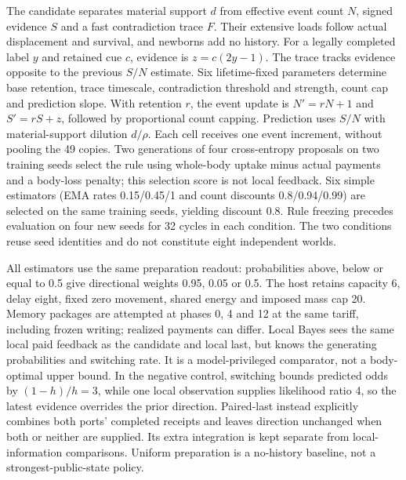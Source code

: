 The candidate separates material support $d$ from effective event count $N$, signed evidence $S$ and a fast contradiction trace $F$. Their extensive loads follow actual displacement and survival, and newborns add no history. For a legally completed label $y$ and retained cue $c$, evidence is $z=c(2y-1)$. The trace tracks evidence opposite to the previous $S/N$ estimate. Six lifetime-fixed parameters determine base retention, trace timescale, contradiction threshold and strength, count cap and prediction slope. With retention $r$, the event update is $N'=rN+1$ and $S'=rS+z$, followed by proportional count capping. Prediction uses $S/N$ with material-support dilution $d/\rho$. Each cell receives one event increment, without pooling the 49 copies. Two generations of four cross-entropy proposals on two training seeds select the rule using whole-body uptake minus actual payments and a body-loss penalty; this selection score is not local feedback. Six simple estimators (EMA rates 0.15/0.45/1 and count discounts 0.8/0.94/0.99) are selected on the same training seeds, yielding discount 0.8. Rule freezing precedes evaluation on four new seeds for 32 cycles in each condition. The two conditions reuse seed identities and do not constitute eight independent worlds.

All estimators use the same preparation readout: probabilities above, below or equal to 0.5 give directional weights 0.95, 0.05 or 0.5. The host retains capacity 6, delay eight, fixed zero movement, shared energy and imposed mass cap 20. Memory packages are attempted at phases 0, 4 and 12 at the same tariff, including frozen writing; realized payments can differ. Local Bayes sees the same local paid feedback as the candidate and local last, but knows the generating probabilities and switching rate. It is a model-privileged comparator, not a body-optimal upper bound. In the negative control, switching bounds predicted odds by $(1-h)/h=3$, while one local observation supplies likelihood ratio 4, so the latest evidence overrides the prior direction. Paired-last instead explicitly combines both ports' completed receipts and leaves direction unchanged when both or neither are supplied. Its extra integration is kept separate from local-information comparisons. Uniform preparation is a no-history baseline, not a strongest-public-state policy.

